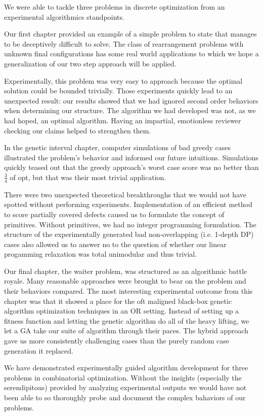 We were able to tackle three problems in discrete optimization from an experimental algorithmics standpoints.  

Our first chapter provided an example of a simple problem to state that manages to be deceptively difficult to solve. The class of rearrangement problems with unknown final configurations has some real world applications to which we hope a generalization of our two step approach will be applied.  

Experimentally, this problem was very easy to approach because the optimal solution could be bounded trivially.  Those experiments quickly lead to an unexpected result: our results showed that we had ignored second order behaviors when determining our structure.  The algorithm we had developed was not, as we had hoped, an optimal algorithm. Having an impartial, emotionless reviewer checking our claims helped to strengthen them.

In the genetic interval chapter, computer simulations of bad greedy cases illustrated the problem’s behavior and informed our future intuitions. Simulations quickly teased out that the greedy approach’s worst case score was no better than $\frac34$ of opt, but that was their most trivial application.

There were two unexpected theoretical breakthroughs that we would not have spotted without performing experiments. Implementation of an efficient method to score partially covered defects caused us to formulate the concept of primitives. Without primitives, we had no integer programming formulation. The structure of the experimentally generated bad non-overlapping (i.e. 1-depth DP) cases also allowed us to answer no to the question of whether our linear progamming relaxation was total unimodular and thus trivial.

Our final chapter, the waiter problem, was structured as an algorithmic battle royale. Many reasonable approaches were brought to bear on the problem and their behaviors compared.  The most interesting experimental outcome from this chapter was that it showed a place for the oft maligned black-box genetic algorithm optimization techniques in an OR setting.  Instead of setting up a fitness function and letting the genetic algorithm do all of the heavy lifting, we let a GA take our suite of algorithm through their paces.  The hybrid approach gave us more consistently challenging cases than the purely random case generation it replaced.

We have demonstrated experimentally guided algorithm development for three problems in combinatorial optimization.  Without the insights (especially the serendipitous) provided by analyzing experimental outputs we would have not been able to so thoroughly probe and document the complex bahaviors of our problems.
